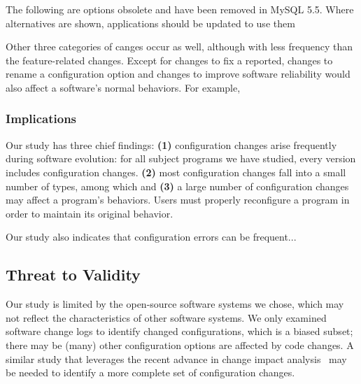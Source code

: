 The following are options obsolete and have been removed in
MySQL 5.5. Where alternatives are shown, applications should
be updated to use them

Other three categories of canges occur as well, although
with less frequency than the feature-related changes.
Except for changes to fix a reported, changes to rename
a configuration option and changes to improve
software reliability would also affect a
software's normal behaviors. For example,







\subsubsection{Implications}

Our study has three chief findings:
\textbf{(1)} configuration
changes arise frequently during software evolution: for
all subject programs we have studied, every version
includes configuration changes. \textbf{(2)} most configuration
changes fall into a small number of types, among
which 
and \textbf{(3)} a large number of
configuration changes may affect a program's
behaviors. Users must properly reconfigure a
program in order to maintain its original behavior.

Our study also indicates that configuration errors
can be frequent... 

\subsection{Threat to Validity}
Our study is limited by the open-source
software systems we chose, which may not reflect
the characteristics of other software systems.
We only examined software change logs to identify
changed configurations, which is a biased
subset; there may be (many) other configuration
options are affected by code changes. A similar
study that leverages the recent advance in
change impact analysis~\cite{} may be needed
to identify a more complete set of
configuration changes.
